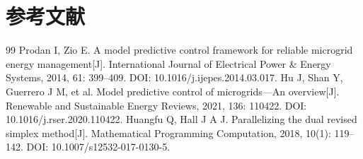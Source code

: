 \section{参考文献}
\begin{thebibliography}{99}
 Prodan I, Zio E. A model predictive control framework for reliable microgrid energy management[J]. International Journal of Electrical Power \& Energy Systems, 2014, 61: 399--409. DOI: 10.1016/j.ijepes.2014.03.017.
 Hu J, Shan Y, Guerrero J M, et al. Model predictive control of microgrids---An overview[J]. Renewable and Sustainable Energy Reviews, 2021, 136: 110422. DOI: 10.1016/j.rser.2020.110422.
 Huangfu Q, Hall J A J. Parallelizing the dual revised simplex method[J]. Mathematical Programming Computation, 2018, 10(1): 119--142. DOI: 10.1007/s12532-017-0130-5.
\end{thebibliography}
